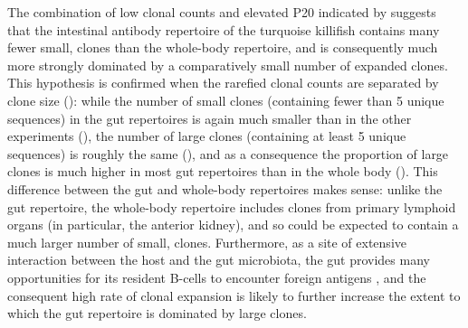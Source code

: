 The combination of low clonal counts and elevated P20 indicated by  suggests that the intestinal antibody repertoire of the turquoise killifish contains many fewer small, \naive clones than the whole-body repertoire, and is consequently much more strongly dominated by a comparatively small number of expanded clones. This hypothesis is confirmed when the rarefied clonal counts are separated by clone size (): while the number of small clones (containing fewer than 5 unique sequences) in the gut repertoires is again much smaller than in the other experiments (), the number of large clones (containing at least 5 unique sequences) is roughly the same (), and as a consequence the proportion of large clones is much higher in most gut repertoires than in the whole body (). This difference between the gut and whole-body repertoires makes sense: unlike the gut repertoire, the whole-body repertoire includes clones from primary lymphoid organs (in particular, the anterior kidney), and so could be expected to contain a much larger number of small, \naive clones. Furthermore, as a site of extensive interaction between the host and the gut microbiota, the gut provides many opportunities for its resident B-cells to encounter foreign antigens \parencite{caruso2009immunosenescence} , and the consequent high rate of clonal expansion is likely to further increase the extent to which the gut repertoire is dominated by large clones.

